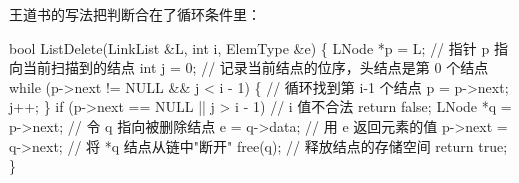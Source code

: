 \documentclass[10.5pt,a4paper,oneside]{article}
\newenvironment{Shaded}{}{}
\newcommand{\CommentTok}[1]{\textcolor[rgb]{0.18,0.55,0.23}{#1}}
\newcommand{\ControlFlowTok}[1]{\textcolor[rgb]{0.12,0.31,0.71}{#1}}
\newcommand{\DataTypeTok}[1]{\textcolor[rgb]{0.12,0.31,0.71}{#1}}
\newcommand{\DecValTok}[1]{\textcolor[rgb]{0.77,0.35,0.07}{#1}}
\newcommand{\KeywordTok}[1]{\textcolor[rgb]{0.12,0.31,0.71}{#1}}
\newcommand{\NormalTok}[1]{#1}
\newcommand{\OperatorTok}[1]{\textcolor[rgb]{0.20,0.20,0.20}{#1}}
\begin{document}
\begin{bookbox}

王道书的写法把判断合在了循环条件里：

\begin{Shaded}
\begin{Highlighting}[]
\DataTypeTok{bool}\NormalTok{ ListDelete}\OperatorTok{(}\NormalTok{LinkList }\OperatorTok{\&}\NormalTok{L}\OperatorTok{,} \DataTypeTok{int}\NormalTok{ i}\OperatorTok{,}\NormalTok{ ElemType }\OperatorTok{\&}\NormalTok{e}\OperatorTok{)} \OperatorTok{\{}
\NormalTok{    LNode }\OperatorTok{*}\NormalTok{p }\OperatorTok{=}\NormalTok{ L}\OperatorTok{;}                   \CommentTok{// 指针 p 指向当前扫描到的结点}
    \DataTypeTok{int}\NormalTok{ j }\OperatorTok{=} \DecValTok{0}\OperatorTok{;}                      \CommentTok{// 记录当前结点的位序，头结点是第 0 个结点}
    \ControlFlowTok{while} \OperatorTok{(}\NormalTok{p}\OperatorTok{{-}\textgreater{}}\NormalTok{next }\OperatorTok{!=}\NormalTok{ NULL }\OperatorTok{\&\&}\NormalTok{ j }\OperatorTok{\textless{}}\NormalTok{ i }\OperatorTok{{-}} \DecValTok{1}\OperatorTok{)} \OperatorTok{\{}   \CommentTok{// 循环找到第 i{-}1 个结点}
\NormalTok{        p }\OperatorTok{=}\NormalTok{ p}\OperatorTok{{-}\textgreater{}}\NormalTok{next}\OperatorTok{;}
\NormalTok{        j}\OperatorTok{++;}
    \OperatorTok{\}}
    \ControlFlowTok{if} \OperatorTok{(}\NormalTok{p}\OperatorTok{{-}\textgreater{}}\NormalTok{next }\OperatorTok{==}\NormalTok{ NULL }\OperatorTok{||}\NormalTok{ j }\OperatorTok{\textgreater{}}\NormalTok{ i }\OperatorTok{{-}} \DecValTok{1}\OperatorTok{)}        \CommentTok{// i 值不合法}
        \ControlFlowTok{return} \KeywordTok{false}\OperatorTok{;}
\NormalTok{    LNode }\OperatorTok{*}\NormalTok{q }\OperatorTok{=}\NormalTok{ p}\OperatorTok{{-}\textgreater{}}\NormalTok{next}\OperatorTok{;}             \CommentTok{// 令 q 指向被删除结点}
\NormalTok{    e }\OperatorTok{=}\NormalTok{ q}\OperatorTok{{-}\textgreater{}}\NormalTok{data}\OperatorTok{;}                    \CommentTok{// 用 e 返回元素的值}
\NormalTok{    p}\OperatorTok{{-}\textgreater{}}\NormalTok{next }\OperatorTok{=}\NormalTok{ q}\OperatorTok{{-}\textgreater{}}\NormalTok{next}\OperatorTok{;}              \CommentTok{// 将 *q 结点从链中"断开"}
\NormalTok{    free}\OperatorTok{(}\NormalTok{q}\OperatorTok{);}                        \CommentTok{// 释放结点的存储空间}
    \ControlFlowTok{return} \KeywordTok{true}\OperatorTok{;}
\OperatorTok{\}}
\end{Highlighting}
\end{Shaded}


\end{bookbox}
\end{document}
